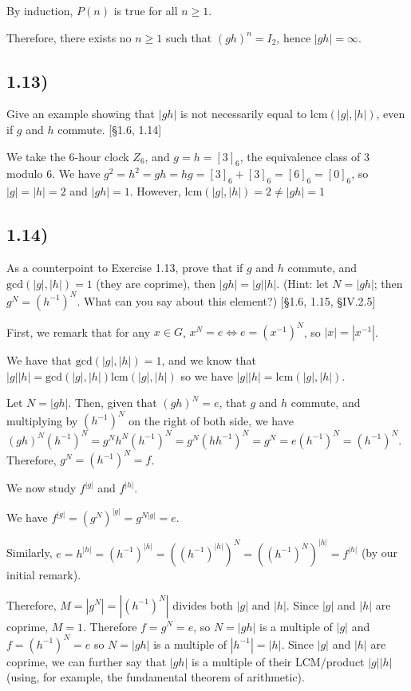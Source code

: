 \documentclass[12pt, letterpaper, twoside]{report}
\begin{document}
By induction, $P(n)$ is true for all $n \geq 1$.

Therefore, there exists no $n \geq 1$ such that $(gh)^n = I_2$, hence $|gh| = \infty$.



\subsection*{1.13)}

Give an example showing that $|gh|$ is not necessarily equal to $\text{lcm}(|g|, |h|)$, even if $g$ and $h$ commute. [§1.6, 1.14]

We take the 6-hour clock $Z_6$, and $g = h = [3]_6$, the equivalence class of 3 modulo 6.  We have $g^2 = h^2 = gh = hg = [3]_6 + [3]_6 = [6]_6 = [0]_6$, so $|g| = |h| = 2$ and $|gh| = 1$. However, $\text{lcm}(|g|, |h|) = 2 \ne |gh| = 1$



\subsection*{1.14)}

As a counterpoint to Exercise 1.13, prove that if $g$ and $h$ commute, and $\text{gcd}(|g|, |h|) = 1$ (they are coprime), then $|gh| = |g| |h|$. (Hint: let $N = |gh|$; then $g^N = (h^{-1})^N$. What can you say about this element?) [§1.6, 1.15, §IV.2.5]

First, we remark that for any $x \in G$, $x^N = e \Leftrightarrow e = (x^{-1})^N$, so $|x| = |x^{-1}|$.

We have that $\text{gcd}(|g|, |h|) = 1$, and we know that $|g| |h| = \text{gcd}(|g|, |h|) \text{lcm}(|g|, |h|)$ so we have $|g||h| = \text{lcm}(|g|, |h|)$.

Let $N = |gh|$. Then, given that $(gh)^N = e$, that $g$ and $h$ commute, and multiplying by $(h^{-1})^N$ on the right of both side, we have $(gh)^N(h^{-1})^N = g^N h^N (h^{-1})^N = g^N (hh^{-1})^N = g^N = e(h^{-1})^N = (h^{-1})^N$. Therefore, $g^N = (h^{-1})^N = f$.

We now study $f^{|g|}$ and $f^{|h|}$.

We have $f^{|g|} = (g^N)^{|g|} = g^{N|g|} = e$.

Similarly, $e = h^{|h|} = (h^{-1})^{|h|} = ((h^{-1})^{|h|})^N = ((h^{-1})^N)^{|h|} = f^{|h|}$ (by our initial remark).

Therefore, $M = |g^N| = |(h^{-1})^N|$ divides both $|g|$ and $|h|$. Since $|g|$ and $|h|$ are coprime, $M = 1$. Therefore $f = g^N = e$, so $N = |gh|$ is a multiple of $|g|$ and $f = (h^{-1})^N = e$ so $N = |gh|$ is a multiple of $|h^{-1}| = |h|$. Since $|g|$ and $|h|$ are coprime, we can further say that $|gh|$ is a multiple of their LCM/product $|g||h|$ (using, for example, the fundamental theorem of arithmetic).
\end{document}
